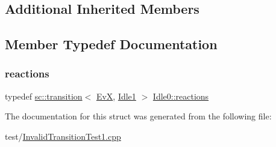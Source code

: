\subsection*{Additional Inherited Members}


\subsection{Member Typedef Documentation}
\mbox{\label{struct_idle0_ab136e60f9bce243bd44aab0302320b11}} 
\subsubsection{\texorpdfstring{reactions}{reactions}}
{\footnotesize\ttfamily typedef \mbox{\hyperlink{classboost_1_1statechart_1_1transition}{sc\+::transition}}$<$ \mbox{\hyperlink{struct_ev_x}{EvX}}, \mbox{\hyperlink{struct_idle1}{Idle1}} $>$ \mbox{\hyperlink{struct_idle0_ab136e60f9bce243bd44aab0302320b11}{Idle0\+::reactions}}}



The documentation for this struct was generated from the following file\+:\begin{DoxyCompactItemize}
\item 
test/\mbox{\hyperlink{_invalid_transition_test1_8cpp}{Invalid\+Transition\+Test1.\+cpp}}\end{DoxyCompactItemize}
